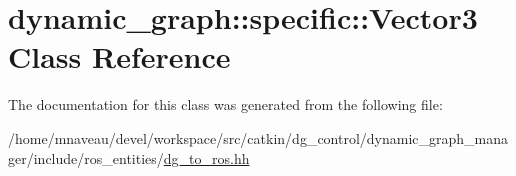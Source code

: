 \hypertarget{classdynamic__graph_1_1specific_1_1Vector3}{}\section{dynamic\+\_\+graph\+:\+:specific\+:\+:Vector3 Class Reference}
\label{classdynamic__graph_1_1specific_1_1Vector3}


The documentation for this class was generated from the following file\+:\begin{DoxyCompactItemize}
\item 
/home/mnaveau/devel/workspace/src/catkin/dg\+\_\+control/dynamic\+\_\+graph\+\_\+manager/include/ros\+\_\+entities/\hyperlink{dg__to__ros_8hh}{dg\+\_\+to\+\_\+ros.\+hh}\end{DoxyCompactItemize}
